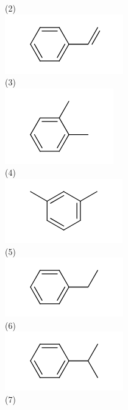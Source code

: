 \documentclass[10pt]{article}
\begin{document}
(2)\\
\includegraphics{smile-ffaee4009f589567f8e99f6615d66ac9f036ea17}\\
(3)\\
\includegraphics{smile-5eb588bb87722fd43233c483ce791c42dc84d3f6}\\
(4)\\
\includegraphics{smile-3bfee99718eea1d3979da4a966257ffb341658cf}\\
(5)\\
\includegraphics{smile-4fbbb59a86bf4057e79664aa6436ca23be8ea174}\\
(6)\\
\includegraphics{smile-0fcc33ffe38271124ca13c4e82231bb8d0cd77e3}\\
(7)
\end{document}
